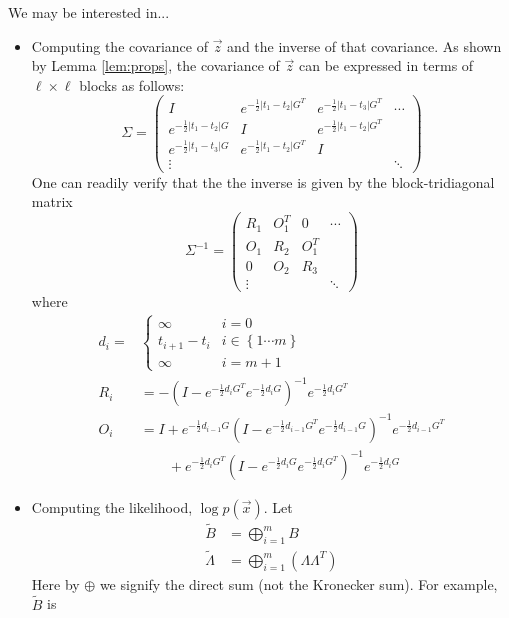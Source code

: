 \documentclass{article}
\theoremstyle{definition}
\begin{document}
We may be interested in...
\begin{itemize}
\item Computing the covariance of $\vec{z}$ and the inverse of that covariance.
As shown by Lemma \ref{lem:props}, the covariance of $\vec{z}$ can be expressed in terms of $\ell \times \ell$ blocks as follows:
\[
\Sigma=\left(\begin{array}{cccc}
I & e^{-\frac{1}{2}\left|t_{1}-t_{2}\right|G^{T}} & e^{-\frac{1}{2}\left|t_{1}-t_{3}\right|G^{T}} & \cdots\\
e^{-\frac{1}{2}\left|t_{1}-t_{2}\right|G} & I & e^{-\frac{1}{2}\left|t_{1}-t_{2}\right|G^{T}}\\
e^{-\frac{1}{2}\left|t_{1}-t_{3}\right|G} & e^{-\frac{1}{2}\left|t_{1}-t_{2}\right|G^{T}} & I\\
\vdots &  &  & \ddots
\end{array}\right)
\]
One can readily verify that the the inverse is given by the block-tridiagonal matrix
\[
\Sigma^{-1}=\left(\begin{array}{cccc}
R_{1} & O_{1}^{T} & 0 & \cdots\\
O_{1} & R_{2} & O_{1}^{T}\\
0 & O_{2} & R_{3}\\
\vdots &  &  & \ddots
\end{array}\right)
\]
where 
\begin{align*}
d_{i}= & \begin{cases}
\infty & i=0\\
t_{i+1}-t_{i} & i\in\left\{ 1\cdots m\right\} \\
\infty & i=m+1
\end{cases}\\
R_{i} & =-(I-e^{-\frac{1}{2}d_{i}G^{T}}e^{-\frac{1}{2}d_{i}G})^{-1}e^{-\frac{1}{2}d_{i}G^{T}}\\
O_{i} & =I+e^{-\frac{1}{2}d_{i-1}G}(I-e^{-\frac{1}{2}d_{i-1}G^{T}}e^{-\frac{1}{2}d_{i-1}G})^{-1}e^{-\frac{1}{2}d_{i-1}G^{T}}\\
 & \qquad+e^{-\frac{1}{2}d_{i}G^{T}}(I-e^{-\frac{1}{2}d_{i}G}e^{-\frac{1}{2}d_{i}G^{T}})^{-1}e^{-\frac{1}{2}d_{i}G}
\end{align*}
\item Computing the likelihood, $\log p(\vec{x})$. Let 
\begin{align*}
\tilde{B} & =\bigoplus_{i=1}^{m}B\\
\tilde{\Lambda} & =\bigoplus_{i=1}^{m}\left(\Lambda\Lambda^{T}\right)
\end{align*}
Here by $\oplus$ we signify the direct sum (not the Kronecker sum).  For example, $\tilde{B}$ is

\end{itemize}
\end{document}
